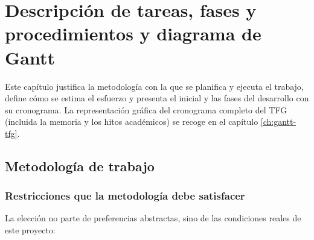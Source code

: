 
\chapter{Descripción de tareas, fases y procedimientos y diagrama de Gantt}
\label{ch:tareas}

Este capítulo justifica la metodología con la que se planifica y ejecuta el trabajo, define cómo se estima el esfuerzo y presenta el  inicial y las fases del desarrollo con su cronograma.
La representación gráfica del cronograma completo del \ac{TFG} (incluida la memoria y los hitos académicos) se recoge en el capítulo \ref{ch:gantt-tfg}.

\section{Metodología de trabajo}
\label{sec:metodologia}

\subsection{Restricciones que la metodología debe satisfacer}
\label{sec:metodologia-restricciones}

La elección no parte de preferencias abstractas, sino de las condiciones reales de este proyecto:

